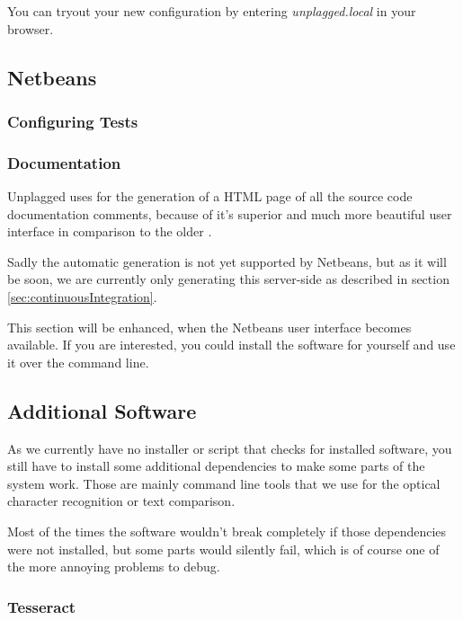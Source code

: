You can tryout your new configuration by entering \textit{unplagged.local} in your browser.

\subsection{Netbeans}

\subsubsection{Configuring Tests}

\subsubsection{Documentation}

Unplagged uses \href{http://apigen.org/}{\citet{Apigen}} for the generation of a HTML page of all the source code documentation comments, 
because of it's superior and much more beautiful user interface in comparison to the older 
\href{http://www.phpdoc.org/}{\citet{PHPDocumentor}}.

Sadly the automatic generation is not yet supported by Netbeans, but as it will be soon\citep{Heise2012}, we are
currently only generating this server-side as described in section \ref{sec:continuousIntegration}. 

This section will be enhanced, when the Netbeans user interface becomes available. If you are interested, you could 
install the software for yourself and use it over the command line.

\subsection{Additional Software}

As we currently have no installer or script that checks for installed software, you still have to install some
additional dependencies to make some parts of the system work. Those are mainly command line tools that we use
for the optical character recognition or text comparison.

Most of the times the software wouldn't break completely if those dependencies were not installed, but some parts 
would silently fail, which is of course one of the more annoying problems to debug.

\subsubsection{Tesseract}

